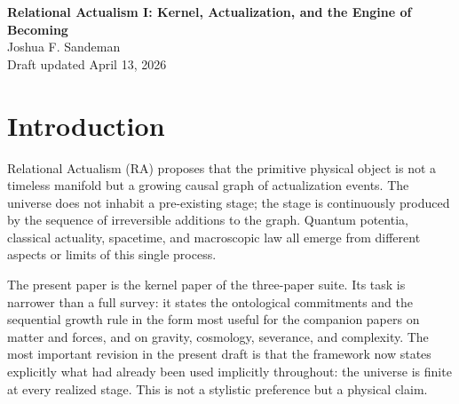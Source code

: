 \documentclass[11pt]{article}
\begin{document}
\begin{center}
{\LARGE \textbf{Relational Actualism I: Kernel, Actualization, and the Engine of Becoming}}\\[0.75em]
{\large Joshua F. Sandeman}\\[0.25em]
{\normalsize Draft updated April 13, 2026}
\end{center}

\begin{abstract}
This first paper of the three-paper Relational Actualism suite states the finite, sequential ontology of the framework and the resulting Engine of Becoming. The principal update in the present draft is the explicit adoption of \emph{Finitary Actuality}: every physically realized universe-state is represented by a finite causal graph. This axiom was already implicit in the stagewise growth dynamics, but its explicit statement clarifies the status of continuum limits, rules out completed infinities as physical states, and sharpens the treatment of severance, entropy, and cosmological nucleation developed in the companion papers. The paper presents the growing causal graph, the structured potentia, the BDG acceptance filter, and the finite-step stochastic update rule in a unified format, while distinguishing physical ontology from continuum translation.
\end{abstract}

\section{Introduction}
Relational Actualism (RA) proposes that the primitive physical object is not a timeless manifold but a growing causal graph of actualization events. The universe does not inhabit a pre-existing stage; the stage is continuously produced by the sequence of irreversible additions to the graph. Quantum potentia, classical actuality, spacetime, and macroscopic law all emerge from different aspects or limits of this single process.

The present paper is the kernel paper of the three-paper suite. Its task is narrower than a full survey: it states the ontological commitments and the sequential growth rule in the form most useful for the companion papers on matter and forces, and on gravity, cosmology, severance, and complexity. The most important revision in the present draft is that the framework now states explicitly what had already been used implicitly throughout: the universe is finite at every realized stage. This is not a stylistic preference but a physical claim.
\end{document}
